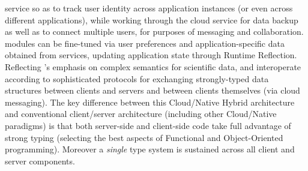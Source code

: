 \documentclass[11pt,letterpaper]{article}
\begin{document}
{\NDPCloud} service so as to track user identity across 
application instances (or even across different applications), 
while working through the cloud service for data backup 
as well as to connect multiple users, for purposes of 
messaging and collaboration.  
{\VersatileUX} modules can be fine-tuned via 
user preferences and application-specific data obtained from 
{\NDPCloud} services, updating application state through  
Runtime Reflection.  Reflecting {\MOSAIC}'s 
emphasis on complex semantics for scientific data, 
{\NDPCloud} and {\VersatileUX} interoperate according to  
sophisticated protocols for exchanging 
strongly-typed data structures between clients and 
servers and between clients themselves (via cloud messaging).  
The key difference between this Cloud/Native Hybrid 
architecture and conventional client/server architecture 
(including other Cloud/Native paradigms) is that 
both server-side and client-side code take full advantage of 
strong typing (selecting the best aspects of 
Functional and Object-Oriented programming).  
Moreover a \textit{single} type system is 
sustained across all client and server components.
\end{document}
